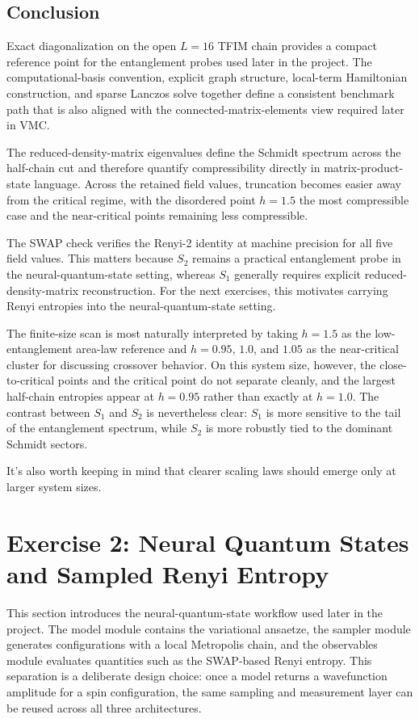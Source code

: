 \documentclass[11pt,a4paper]{article}
\begin{document}
    \subsection*{Conclusion}

    Exact diagonalization on the open $L=16$ TFIM chain provides a compact reference point for the entanglement probes used later in the project. The computational-basis convention, explicit graph structure, local-term Hamiltonian construction, and sparse Lanczos solve together define a consistent benchmark path that is also aligned with the connected-matrix-elements view required later in VMC.

    The reduced-density-matrix eigenvalues define the Schmidt spectrum across the half-chain cut and therefore quantify compressibility directly in matrix-product-state language. Across the retained field values, truncation becomes easier away from the critical regime, with the disordered point $h=1.5$ the most compressible case and the near-critical points remaining less compressible.

    The SWAP check verifies the Renyi-2 identity at machine precision for all five field values. This matters because $S_2$ remains a practical entanglement probe in the neural-quantum-state setting, whereas $S_1$ generally requires explicit reduced-density-matrix reconstruction. For the next exercises, this motivates carrying Renyi entropies into the neural-quantum-state setting.

    The finite-size scan is most naturally interpreted by taking $h=1.5$ as the low-entanglement area-law reference and $h=0.95$, $1.0$, and $1.05$ as the near-critical cluster for discussing crossover behavior. On this system size, however, the close-to-critical points and the critical point do not separate cleanly, and the largest half-chain entropies appear at $h=0.95$ rather than exactly at $h=1.0$. The contrast between $S_1$ and $S_2$ is nevertheless clear: $S_1$ is more sensitive to the tail of the entanglement spectrum, while $S_2$ is more robustly tied to the dominant Schmidt sectors.

    It's also worth keeping in mind that clearer scaling laws should emerge only at larger system sizes.

\section*{Exercise 2: Neural Quantum States and Sampled Renyi Entropy}

This section introduces the neural-quantum-state workflow used later in the project. The model module contains the variational ansaetze, the sampler module generates configurations with a local Metropolis chain, and the observables module evaluates quantities such as the SWAP-based Renyi entropy. This separation is a deliberate design choice: once a model returns a wavefunction amplitude for a spin configuration, the same sampling and measurement layer can be reused across all three architectures.
\end{document}
